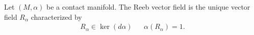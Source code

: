 
 
    Let $(M, \alpha)$ be a contact manifold. The Reeb vector field is the unique vector field $R_\alpha$ characterized by 
    \begin{align*} R_\alpha\in \ker(d\alpha) && \alpha(R_\alpha)=1.\end{align*}
    \label{def:reebVectorField}
 